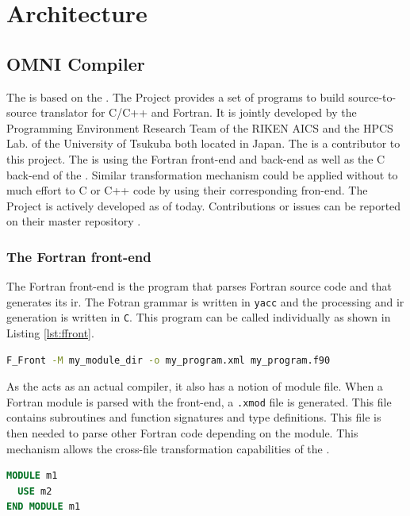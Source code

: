 \chapter{Architecture}
\section{OMNI Compiler}
The \clawfcomp is based on the \omni\cite{omni:website}. The \omni Project
provides a set of programs to build source-to-source translator for C/C++
and Fortran. It is jointly developed by the Programming Environment Research
Team of the RIKEN AICS and the HPCS Lab. of the University of Tsukuba both
located in Japan. The \clawfcomp is a contributor to this project. 
The \clawfcomp is using the Fortran front-end and back-end as well as the 
C back-end of the \omni. Similar transformation mechanism could be
applied without to much effort to C or C++ code by using their corresponding
fron-end. The \omni Project is actively developed as of today. Contributions or 
issues can be reported on their master repository \cite{omni:github}.

\subsection{The Fortran front-end}
The Fortran front-end is the program that parses Fortran source code and that
generates its \gls{ir}. The Fotran grammar is written in \lstinline|yacc| and 
the processing and \gls{ir} generation is written in \lstinline|C|. This program
can be called individually as shown in Listing \ref{lst:ffront}.

\begin{lstlisting}[label=lst:ffront, language=Bash, caption=Call F\_Front]
F_Front -M my_module_dir -o my_program.xml my_program.f90
\end{lstlisting}

As the \omni acts as an actual compiler, it also has a notion of module file.
When a Fortran module is parsed with the front-end, a \lstinline|.xmod| file is
generated. This file contains subroutines and function signatures and 
type definitions. This file is then needed to parse other Fortran code depending 
on the module. This mechanism allows the cross-file transformation capabilities
of the \clawfcomp.

\begin{lstlisting}[label=lst:m1, language=Fortran, caption=module\_m1.f90]
MODULE m1
  USE m2
END MODULE m1
\end{lstlisting}

